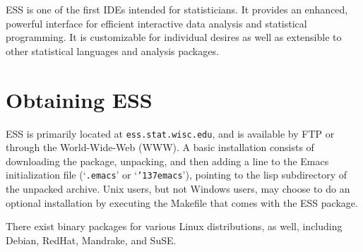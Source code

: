 \documentclass{article}
\newcommand{\stexttt}[1]{{\small\texttt{#1}}}
\newcommand{\US}{{\char'137}}        %
\newcommand{\file}[1]{`\stexttt{#1}'}
\begin{document}
ESS is one of the first IDEs intended for statisticians.  It provides
an enhanced, powerful interface for efficient interactive data
analysis and statistical programming.  It is customizable for
individual desires as well as extensible to other statistical
languages and analysis packages.

\singlespace



\appendix
\section{Obtaining ESS}
\label{sec:getIt}

ESS \citep{ESS} is primarily located at \stexttt{ess.stat.wisc.edu}, and is
available by FTP or through the World-Wide-Web (WWW).  A basic
installation consists of downloading the package, unpacking, and then
adding a line to the Emacs initialization file (\file{.emacs} or
\file{\US emacs}), pointing to the lisp subdirectory of the unpacked
archive.  Unix users, but not Windows users, may choose to do an
optional installation by executing the Makefile that comes with the
ESS package.

There exist binary packages for various Linux distributions, as well,
including Debian, RedHat, Mandrake, and SuSE.
\end{document}
